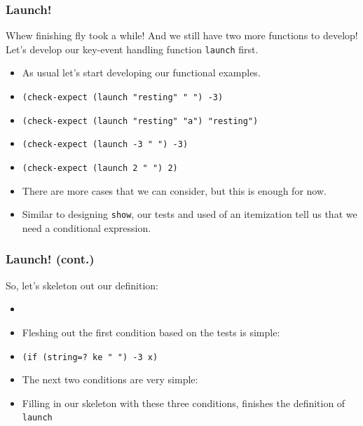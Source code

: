 \documentclass{beamer}
\begin{document}
\begin{frame}
  \frametitle{Launch!}
  Whew finishing fly took a while! And we still have two more functions
  to develop! Let's develop our key-event handling function
  \texttt{launch} first.
  \begin{itemize}
  \item<2-> As usual let's start developing our functional examples.
  \item<3-> \texttt{(check-expect (launch "resting" " ") -3)}
  \item<4-> \texttt{(check-expect (launch "resting" "a") "resting")}
  \item<5-> \texttt{(check-expect (launch -3 " ") -3)}
  \item<6-> \texttt{(check-expect (launch 2 " ") 2)}
  \item<7-> There are more cases that we can consider, but this is enough
    for now.
  \item<8-> Similar to designing \texttt{show}, our tests and
    used of an itemization tell us that we need a conditional expression.
  \end{itemize}
\end{frame}


\launchSimple{
\begin{verbatim}
    [(<= -3 x -1) x]
    [(>= x 0) x]
\end{verbatim}
}

\begin{frame}
  \frametitle{Launch! (cont.)}
  So, let's skeleton out our definition:
  \begin{itemize}
  \item<2-> \launchSkeleton
  \item<3-> Fleshing out the first condition based on the tests is simple:
  \item<4-> \texttt{(if (string=? ke " ") -3 x)}
  \item<5-> The next two conditions are very simple:
    \launchSimple
  \item<6-> Filling in our skeleton with these three conditions,
    finishes the definition of \texttt{launch}
  \end{itemize}
\end{frame}
\end{document}
